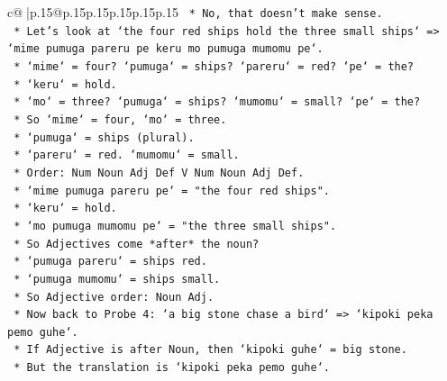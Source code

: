 \documentclass{article}
\begin{document}
{\begin{supertabular}{c@{$\;$}|p{.15\linewidth}@{}p{.15\linewidth}p{.15\linewidth}p{.15\linewidth}p{.15\linewidth}p{.15\linewidth}}
{{{\texttt{                                        *   No, that doesn't make sense.} \\
\texttt{                                        *   Let's look at `the four red ships hold the three small ships` => `mime pumuga pareru pe keru mo pumuga mumomu pe`.} \\
\texttt{                                            *   `mime` = four? `pumuga` = ships? `pareru` = red? `pe` = the?} \\
\texttt{                                            *   `keru` = hold.} \\
\texttt{                                            *   `mo` = three? `pumuga` = ships? `mumomu` = small? `pe` = the?} \\
\texttt{                                            *   So `mime` = four, `mo` = three.} \\
\texttt{                                            *   `pumuga` = ships (plural).} \\
\texttt{                                            *   `pareru` = red. `mumomu` = small.} \\
\texttt{                                            *   Order: Num Noun Adj Def V Num Noun Adj Def.} \\
\texttt{                                            *   `mime pumuga pareru pe` = "the four red ships".} \\
\texttt{                                            *   `keru` = hold.} \\
\texttt{                                            *   `mo pumuga mumomu pe` = "the three small ships".} \\
\texttt{                                            *   So Adjectives come *after* the noun?} \\
\texttt{                                            *   `pumuga pareru` = ships red.} \\
\texttt{                                            *   `pumuga mumomu` = ships small.} \\
\texttt{                                            *   So Adjective order: Noun Adj.} \\
\texttt{                                            *   Now back to Probe 4: `a big stone chase a bird` => `kipoki peka pemo guhe`.} \\
\texttt{                                            *   If Adjective is after Noun, then `kipoki guhe` = big stone.} \\
\texttt{                                            *   But the translation is `kipoki peka pemo guhe`.} \\
}}}
\end{supertabular}}
\end{document}
